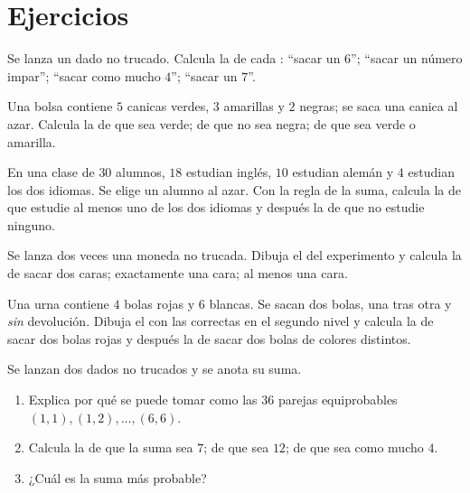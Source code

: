 \section{Ejercicios}

\begin{exercise}[$\star$]\label{exo:g10:proba:1}
Se lanza un dado no trucado. Calcula la  de cada :
``sacar un $6$''; ``sacar un número impar''; ``sacar como mucho $4$'';
``sacar un $7$''.
\end{exercise}

\begin{exercise}[$\star$]\label{exo:g10:proba:2}
Una bolsa contiene $5$ canicas verdes, $3$ amarillas y $2$ negras; se saca
una canica al azar. Calcula la  de que sea verde; de que no
sea negra; de que sea verde o amarilla.
\end{exercise}

\begin{exercise}[$\star$]\label{exo:g10:proba:3}
En una clase de $30$ alumnos, $18$ estudian inglés, $10$ estudian alemán y
$4$ estudian los dos idiomas. Se elige un alumno al azar. Con la regla de
la suma, calcula la  de que estudie al menos uno de los dos
idiomas y después la de que no estudie ninguno.
\end{exercise}

\begin{exercise}[$\star$]\label{exo:g10:proba:4}
Se lanza dos veces una moneda no trucada. Dibuja el  del experimento
y calcula la  de sacar dos caras; exactamente una cara; al
menos una cara.
\end{exercise}

\begin{exercise}[$\star\star$]\label{exo:g10:proba:5}
Una urna contiene $4$ bolas rojas y $6$ blancas. Se sacan dos bolas, una
tras otra y \emph{sin} devolución. Dibuja el  con las 
correctas en el segundo nivel y calcula la  de sacar dos bolas
rojas y después la de sacar dos bolas de colores distintos.
\end{exercise}

\begin{exercise}[$\star\star$]\label{exo:g10:proba:6}
Se lanzan dos dados no trucados y se anota su suma.
\begin{enumerate}
  \item Explica por qué se puede tomar como  las $36$
        parejas equiprobables $(1,1), (1,2), \dots, (6,6)$.
  \item Calcula la  de que la suma sea $7$; de que sea $12$;
        de que sea como mucho $4$.
  \item ¿Cuál es la suma más probable?
\end{enumerate}
\end{exercise}

